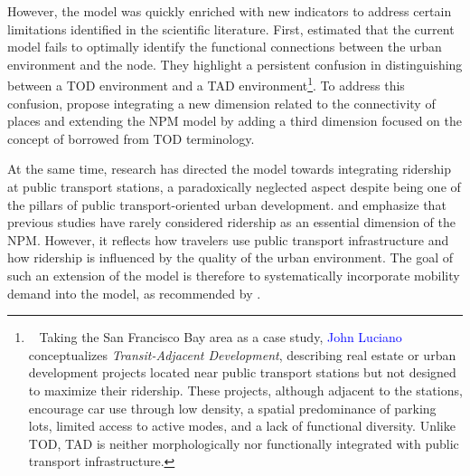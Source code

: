 \begin{refsegment}
However, the model was quickly enriched with new indicators to address certain limitations identified in the scientific literature. First, \textcolor{blue}{\textcite[4-5]{zhang_make_2023}} estimated that the current model fails to optimally identify the functional connections between the urban environment and the node. They highlight a persistent confusion in distinguishing between a \acrshort{TOD} environment and a \acrfull{TAD} environment\footnote{~
    Taking the San Francisco Bay area as a case study, \textcolor{blue}{John Luciano} \textcolor{blue}{\textcite[3]{renne_transit-adjacent_2009}} conceptualizes \textsl{Transit-Adjacent Development}, describing real estate or urban development projects located near public transport stations but not designed to maximize their ridership. These projects, although adjacent to the stations, encourage car use through low density, a spatial predominance of parking lots, limited access to \gls{active modes}, and a lack of functional diversity. Unlike \acrshort{TOD}, \acrshort{TAD} is neither morphologically nor functionally integrated with public transport infrastructure.
}. To address this confusion, \textcolor{blue}{\textcite[271]{li_transit_2019}} propose integrating a new dimension related to the connectivity of places and extending the \acrshort{NPM} model by adding a third dimension focused on the concept of  borrowed from \acrshort{TOD} terminology.%

At the same time, research has directed the model towards integrating ridership at public transport stations, a paradoxically neglected aspect despite being one of the pillars of public transport-oriented urban development. \textcolor{blue}{\textcite[2]{cao_coordination_2020}} and \textcolor{blue}{\textcite[3]{amini_pishro_node_2022}} emphasize that previous studies have rarely considered ridership as an essential dimension of the \acrshort{NPM}. However, it reflects how travelers use public transport infrastructure and how ridership is influenced by the quality of the urban environment. The goal of such an extension of the model is therefore to systematically incorporate mobility demand into the model, as recommended by \textcolor{blue}{\textcite[2]{liao_evaluating_2022}}.%


\end{refsegment}
